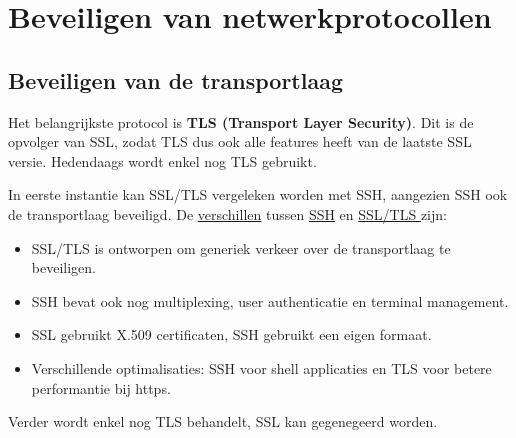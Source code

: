 \documentclass{report}
\begin{document}
\begin{enumerate}
	\end{enumerate}


	\section{Beveiligen van netwerkprotocollen}
	\subsection{Beveiligen van de transportlaag}
	Het belangrijkste protocol is \textbf{TLS (Transport Layer Security)}. Dit is de opvolger van SSL, zodat TLS dus ook alle features heeft van de laatste SSL versie. Hedendaags wordt enkel nog TLS gebruikt.


	In eerste instantie kan SSL/TLS vergeleken worden met SSH, aangezien SSH ook de transportlaag beveiligd. De \underline{verschillen} tussen \underline{SSH} en \underline{SSL/TLS } zijn:
	\begin{itemize}
		\item SSL/TLS  is ontworpen om generiek verkeer over de transportlaag te beveiligen.
		\item SSH bevat ook nog multiplexing, user authenticatie en terminal management. 
		\item SSL gebruikt X.509 certificaten, SSH gebruikt een eigen formaat.
		\item Verschillende optimalisaties: SSH voor shell applicaties en TLS voor betere performantie bij https.
	\end{itemize}

	Verder wordt enkel nog TLS behandelt, SSL kan gegenegeerd worden.
\end{document}
